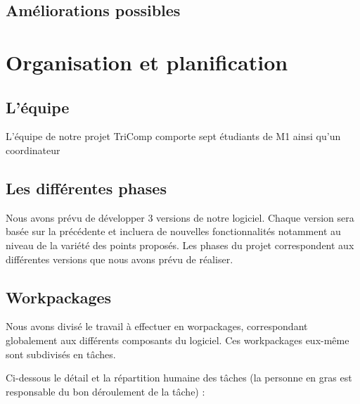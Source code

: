 \documentclass{article}
\begin{document}
\subsection{Améliorations possibles}

\section{Organisation et planification}

\subsection{L'équipe}

L'équipe de notre projet TriComp comporte sept étudiants de M1 ainsi qu'un coordinateur

\subsection{Les différentes phases}

Nous avons prévu de développer 3 versions de notre logiciel. Chaque version sera basée sur la précédente et incluera de nouvelles fonctionnalités notamment au niveau de la variété des points proposés.
Les phases du projet correspondent aux différentes versions que nous avons prévu de réaliser.


\subsection{Workpackages}

Nous avons divisé le travail à effectuer en worpackages, correspondant globalement aux différents composants du logiciel. Ces workpackages eux-même sont subdivisés en tâches.

Ci-dessous le détail et la répartition humaine des tâches (la personne en gras est responsable du bon déroulement de la tâche) :
\end{document}
